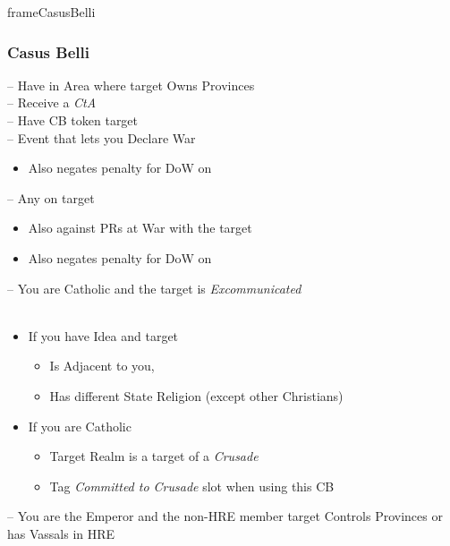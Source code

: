 \documentclass[10pt]{article}
\newlength{\fhCasusBelli} \setlength\fhCasusBelli{12\baselineskip}
\begin{document}
\begin{dynamiccontents*}{frameCasusBelli}\begin{eubox}{\fhCasusBelli}
	\begin{multicols}{2}
		\subsubsection*{Casus Belli }
		 -- Have \claim in Area where target Owns Provinces\\
		 -- Receive a \emph{CtA}\\
		 -- Have CB token target\\
		 -- Event that lets you Declare War\\
		\begin{itemize}
			\item Also negates penalty for DoW on \marriage
		\end{itemize}
		 -- Any \disputedsuccession on target\\
		\begin{itemize}
			\item Also against PRs at War with the target
			\item Also negates penalty for DoW on \marriage
		\end{itemize}
		 -- You are Catholic and the target is \emph{Excommunicated}\\
		\\
		\begin{itemize}
			\item If you have  Idea and target
			\begin{itemize}
				\item Is Adjacent to you, 
				\item Has different State Religion (except other Christians)
			\end{itemize}
			\item If you are Catholic
			\begin{itemize}
				\item Target Realm is a target of a \emph{Crusade}
				\item Tag \emph{Committed to Crusade} slot when using this CB
			\end{itemize}
		\end{itemize}
		 -- You are the Emperor and the non-HRE member target Controls Provinces or has Vassals in HRE
	\end{multicols}
\end{eubox}\end{dynamiccontents*}
\end{document}
